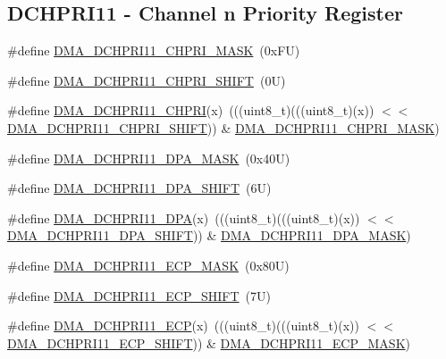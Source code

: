 \subsection*{D\+C\+H\+P\+R\+I11 -\/ Channel n Priority Register}
\begin{DoxyCompactItemize}
\item 
\#define \mbox{\hyperlink{group___d_m_a___register___masks_ga4b7b6d2e60a016af53e079b20cad7b99}{D\+M\+A\+\_\+\+D\+C\+H\+P\+R\+I11\+\_\+\+C\+H\+P\+R\+I\+\_\+\+M\+A\+SK}}~(0x\+F\+U)
\item 
\#define \mbox{\hyperlink{group___d_m_a___register___masks_ga832f65fc63433161ecd5d5ffdfbd125d}{D\+M\+A\+\_\+\+D\+C\+H\+P\+R\+I11\+\_\+\+C\+H\+P\+R\+I\+\_\+\+S\+H\+I\+FT}}~(0\+U)
\item 
\#define \mbox{\hyperlink{group___d_m_a___register___masks_gaec1d6da6f74d6a49cc3499e451acb9d6}{D\+M\+A\+\_\+\+D\+C\+H\+P\+R\+I11\+\_\+\+C\+H\+P\+RI}}(x)~(((uint8\+\_\+t)(((uint8\+\_\+t)(x)) $<$$<$ \mbox{\hyperlink{group___d_m_a___register___masks_ga832f65fc63433161ecd5d5ffdfbd125d}{D\+M\+A\+\_\+\+D\+C\+H\+P\+R\+I11\+\_\+\+C\+H\+P\+R\+I\+\_\+\+S\+H\+I\+FT}})) \& \mbox{\hyperlink{group___d_m_a___register___masks_ga4b7b6d2e60a016af53e079b20cad7b99}{D\+M\+A\+\_\+\+D\+C\+H\+P\+R\+I11\+\_\+\+C\+H\+P\+R\+I\+\_\+\+M\+A\+SK}})
\item 
\#define \mbox{\hyperlink{group___d_m_a___register___masks_gabd5fcd0b0589ce541af05db3c94cf62e}{D\+M\+A\+\_\+\+D\+C\+H\+P\+R\+I11\+\_\+\+D\+P\+A\+\_\+\+M\+A\+SK}}~(0x40\+U)
\item 
\#define \mbox{\hyperlink{group___d_m_a___register___masks_ga9d922595ae26b09e86e4c7a86a0a476f}{D\+M\+A\+\_\+\+D\+C\+H\+P\+R\+I11\+\_\+\+D\+P\+A\+\_\+\+S\+H\+I\+FT}}~(6\+U)
\item 
\#define \mbox{\hyperlink{group___d_m_a___register___masks_ga05822002a47654b31fb1d236e1ad91fe}{D\+M\+A\+\_\+\+D\+C\+H\+P\+R\+I11\+\_\+\+D\+PA}}(x)~(((uint8\+\_\+t)(((uint8\+\_\+t)(x)) $<$$<$ \mbox{\hyperlink{group___d_m_a___register___masks_ga9d922595ae26b09e86e4c7a86a0a476f}{D\+M\+A\+\_\+\+D\+C\+H\+P\+R\+I11\+\_\+\+D\+P\+A\+\_\+\+S\+H\+I\+FT}})) \& \mbox{\hyperlink{group___d_m_a___register___masks_gabd5fcd0b0589ce541af05db3c94cf62e}{D\+M\+A\+\_\+\+D\+C\+H\+P\+R\+I11\+\_\+\+D\+P\+A\+\_\+\+M\+A\+SK}})
\item 
\#define \mbox{\hyperlink{group___d_m_a___register___masks_ga0fa3fd877caf7576aa86d45cd74c2f14}{D\+M\+A\+\_\+\+D\+C\+H\+P\+R\+I11\+\_\+\+E\+C\+P\+\_\+\+M\+A\+SK}}~(0x80\+U)
\item 
\#define \mbox{\hyperlink{group___d_m_a___register___masks_gadd7793c7e5fb49aed57108e5fef14683}{D\+M\+A\+\_\+\+D\+C\+H\+P\+R\+I11\+\_\+\+E\+C\+P\+\_\+\+S\+H\+I\+FT}}~(7\+U)
\item 
\#define \mbox{\hyperlink{group___d_m_a___register___masks_gaacd7984022f4961ff504a7fea12cbd72}{D\+M\+A\+\_\+\+D\+C\+H\+P\+R\+I11\+\_\+\+E\+CP}}(x)~(((uint8\+\_\+t)(((uint8\+\_\+t)(x)) $<$$<$ \mbox{\hyperlink{group___d_m_a___register___masks_gadd7793c7e5fb49aed57108e5fef14683}{D\+M\+A\+\_\+\+D\+C\+H\+P\+R\+I11\+\_\+\+E\+C\+P\+\_\+\+S\+H\+I\+FT}})) \& \mbox{\hyperlink{group___d_m_a___register___masks_ga0fa3fd877caf7576aa86d45cd74c2f14}{D\+M\+A\+\_\+\+D\+C\+H\+P\+R\+I11\+\_\+\+E\+C\+P\+\_\+\+M\+A\+SK}})
\end{DoxyCompactItemize}
